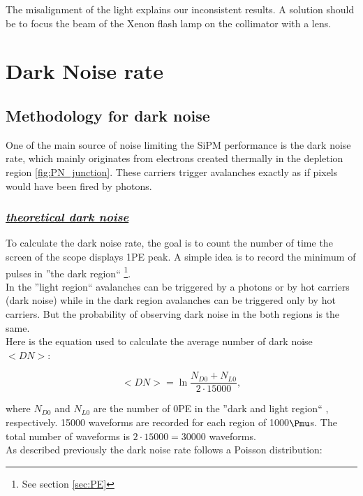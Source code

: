 \documentclass[a4paper, 11pt]{report}%
\newcommand{\xfl}{Xenon flash lamp }
\begin{document}
  The misalignment of the light explains our inconsistent results. A solution should be to focus the beam of the \xfl on the collimator
  with a lens.   
  
  \section{Dark Noise rate}\label{sec:DN}
  
     
  \subsection{Methodology for dark noise}
  
  One of the main source of noise limiting the SiPM performance is the dark noise rate, which mainly originates from electrons 
  created thermally in the depletion region \ref{fig:PN_junction}. These carriers trigger avalanches exactly as 
  if pixels would have been fired by photons.
  
  \subsubsection{\textit{\underline{theoretical dark noise}}}

  
  To calculate the dark noise rate, the goal is to count the number of time the screen of the scope
  displays 1PE peak. A simple idea is 
  to record the minimum of pulses in ''the dark region`` \footnote{See section \ref{sec:PE}}.\\
  In the ''light region`` avalanches can be triggered by a photons or by hot carriers (dark noise) while in the dark region
  avalanches can be triggered only by hot carriers. But the probability of observing dark noise in the both regions is the same. 
  \\
  
  Here is the equation used to calculate the average number of dark noise $<DN>$:
  
  \begin{equation}
    <DN> = \ln{\frac{N_{D0}+N_{L0}}{2\cdot15000}},
  \end{equation}

  where $N_{D0}$ and $N_{L0}$ are the number of 0PE in the ''dark and light region`` , respectively. 15000 waveforms are recorded
  for each region of 1000$\Pmu$s. The total number of waveforms is $2\cdot15000 = 30000$ waveforms. 
  \\
  
  As described previously the dark noise rate follows a Poisson distribution:
  
\end{document}
